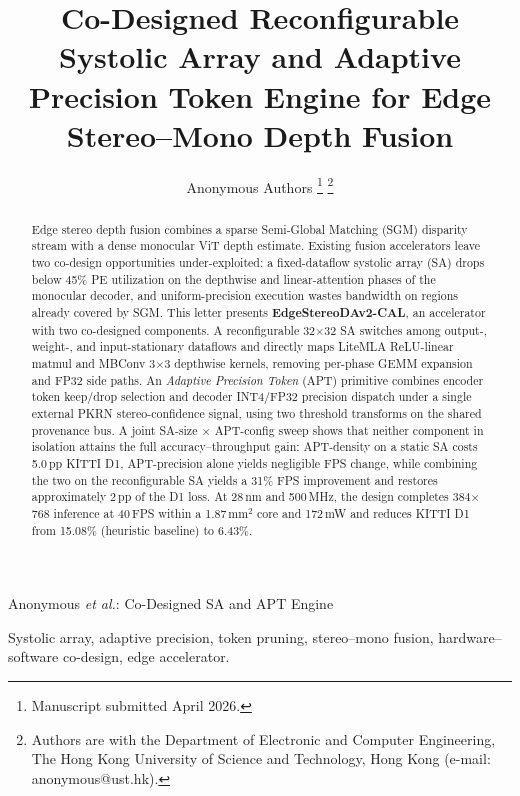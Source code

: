 \documentclass[lettersize,journal]{IEEEtran}
\begin{document}
\title{Co-Designed Reconfigurable Systolic Array and Adaptive Precision Token Engine for Edge Stereo--Mono Depth Fusion}

\author{Anonymous Authors
\thanks{Manuscript submitted April 2026.}
\thanks{Authors are with the Department of Electronic and Computer Engineering, The Hong Kong University of Science and Technology, Hong Kong (e-mail: anonymous@ust.hk).}
}

%
{Anonymous \MakeLowercase{\textit{et al.}}: Co-Designed SA and APT Engine}

\maketitle

\begin{abstract}
Edge stereo depth fusion combines a sparse Semi-Global Matching (SGM) disparity stream with a dense monocular ViT depth estimate. Existing fusion accelerators leave two co-design opportunities under-exploited: a fixed-dataflow systolic array (SA) drops below 45\% PE utilization on the depthwise and linear-attention phases of the monocular decoder, and uniform-precision execution wastes bandwidth on regions already covered by SGM. This letter presents \textbf{EdgeStereoDAv2-CAL}, an accelerator with two co-designed components. A reconfigurable 32$\times$32 SA switches among output-, weight-, and input-stationary dataflows and directly maps LiteMLA ReLU-linear matmul and MBConv 3$\times$3 depthwise kernels, removing per-phase GEMM expansion and FP32 side paths. An \emph{Adaptive Precision Token} (APT) primitive combines encoder token keep/drop selection and decoder INT4/FP32 precision dispatch under a single external PKRN stereo-confidence signal, using two threshold transforms on the shared provenance bus. A joint SA-size $\times$ APT-config sweep shows that neither component in isolation attains the full accuracy--throughput gain: APT-density on a static SA costs 5.0\,pp KITTI D1, APT-precision alone yields negligible FPS change, while combining the two on the reconfigurable SA yields a 31\% FPS improvement and restores approximately 2\,pp of the D1 loss. At 28\,nm and 500\,MHz, the design completes 384$\times$768 inference at 40\,FPS within a 1.87\,mm$^2$ core and 172\,mW and reduces KITTI D1 from 15.08\% (heuristic baseline) to 6.43\%.
\end{abstract}

\begin{IEEEkeywords}
Systolic array, adaptive precision, token pruning, stereo--mono fusion, hardware--software co-design, edge accelerator.
\end{IEEEkeywords}
\end{document}
